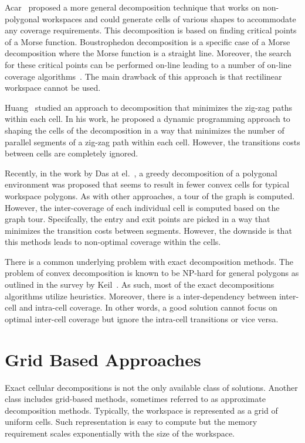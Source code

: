 \documentclass[../main.tex]{subfiles}
\begin{document}
Acar~\cite{Acar2002morse} proposed a more general decomposition technique that works on non-polygonal workspaces and could generate cells of various shapes to accommodate any coverage requirements. This decomposition is based on finding critical points of a Morse function. Boustrophedon decomposition is a specific case of a Morse decomposition where the Morse function is a straight line. Moreover, the search for these critical points can be performed on-line leading to a number of on-line coverage algorithms~\cite{acar2002sensor}. The main drawback of this approach is that rectilinear workspace cannot be used. 

Huang~\cite{Huang2001optimal} studied an approach to decomposition that minimizes the zig-zag paths within each cell. In his work, he proposed a dynamic programming approach to shaping the cells of the decomposition in a way that minimizes the number of parallel segments of a zig-zag path within each cell. However, the transitions costs between cells are completely ignored.

Recently, in the work by Das at el.~\cite{das2014mapping}, a greedy decomposition of a polygonal environment was proposed that seems to result in fewer convex cells for typical workspace polygons. As with other approaches, a tour of the graph is computed. However, the inter-coverage of each individual cell is computed based on the graph tour. Specifcally, the entry and exit points are picked in a way that minimizes the transition costs between segments. However, the downside is that this methods leads to non-optimal coverage within the cells.

There is a common underlying problem with exact decomposition methods. The problem of convex decomposition is known to be NP-hard for general polygons as outlined in the survey by Keil~\cite{keil2000polygon}. As such, most of the exact decompositions algorithms utilize heuristics. Moreover, there is a inter-dependency between inter-cell and intra-cell coverage. In other words, a good solution cannot focus on optimal inter-cell coverage but ignore the intra-cell transitions or vice versa.

\section{Grid Based Approaches}
\label{section:grid_based_approaches}

Exact cellular decompositions is not the only available class of solutions. Another class includes grid-based methods, sometimes referred to as approximate decomposition methods. Typically, the workspace is represented as a grid of uniform cells. Such representation is easy to compute but the memory requirement scales exponentially with the size of the workspace.
\end{document}
